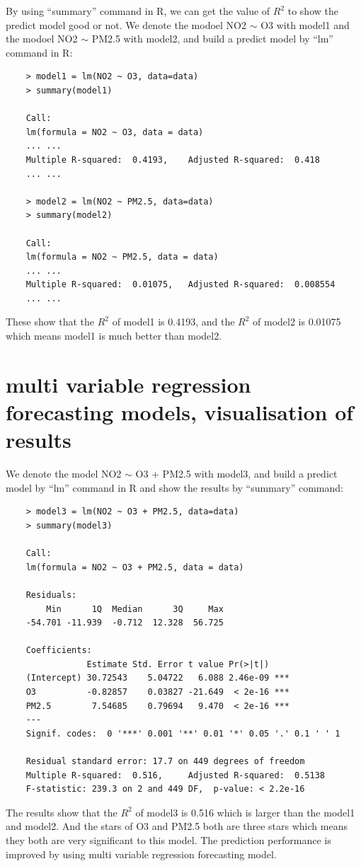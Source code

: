 \documentclass[a4paper,12pt,reqno]{report}
\begin{document}
By using ``summary'' command in R, we can get the value of $R^2$ to show the predict model good or not.
We denote the modoel NO2 $\sim$ O3 with model1 and the modoel NO2 $\sim$ PM2.5 with model2, and build a predict model by ``lm'' command in R:
\begin{lstlisting}
    > model1 = lm(NO2 ~ O3, data=data)
    > summary(model1)

    Call:
    lm(formula = NO2 ~ O3, data = data)
    ... ...
    Multiple R-squared:  0.4193,    Adjusted R-squared:  0.418
    ... ...

    > model2 = lm(NO2 ~ PM2.5, data=data)
    > summary(model2)

    Call:
    lm(formula = NO2 ~ PM2.5, data = data)
    ... ...
    Multiple R-squared:  0.01075,   Adjusted R-squared:  0.008554 
    ... ...
\end{lstlisting}
These show that the $R^2$ of model1 is 0.4193, and the $R^2$ of model2 is 0.01075 which means model1 is much better than model2.
\section{multi variable regression forecasting models, visualisation of results}
\label{sec:multi variable regression forecasting models, visualisation of results}
We denote the model NO2 $\sim$ O3 + PM2.5 with model3, and build a predict model by ``lm'' command in R and show the results by ``summary'' command:
\begin{lstlisting}
    > model3 = lm(NO2 ~ O3 + PM2.5, data=data)
    > summary(model3)

    Call:
    lm(formula = NO2 ~ O3 + PM2.5, data = data)

    Residuals:
        Min      1Q  Median      3Q     Max
    -54.701 -11.939  -0.712  12.328  56.725

    Coefficients:
                Estimate Std. Error t value Pr(>|t|)
    (Intercept) 30.72543    5.04722   6.088 2.46e-09 ***
    O3          -0.82857    0.03827 -21.649  < 2e-16 ***
    PM2.5        7.54685    0.79694   9.470  < 2e-16 ***
    ---
    Signif. codes:  0 '***' 0.001 '**' 0.01 '*' 0.05 '.' 0.1 ' ' 1

    Residual standard error: 17.7 on 449 degrees of freedom
    Multiple R-squared:  0.516,     Adjusted R-squared:  0.5138
    F-statistic: 239.3 on 2 and 449 DF,  p-value: < 2.2e-16
\end{lstlisting}
The results show that the $R^2$ of model3 is 0.516 which is larger than the model1 and model2. 
And the stars of O3 and PM2.5 both are three stars which means they both are very significant to this model.
The prediction performance is improved by using multi variable regression forecasting model.
\end{document}
